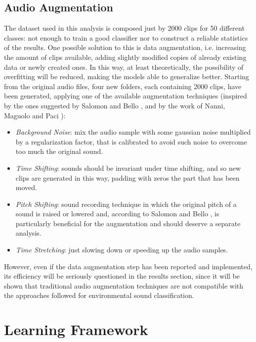 \subsection{Audio Augmentation}
\label{sec:audio_augmentation}
The dataset used in this analysis is composed just by 2000 clips for 50 different classes: not enough to train a good classifier nor to construct a reliable statistics of the results.
One possible solution to this is data augmentation, i.e. increasing the amount of clips available, adding slightly modified copies of already existing data or newly created ones. In this way, at least theoretically, the possibility of overfitting will be reduced, making the models able to generalize better. Starting from the original audio files, four new folders, each containing 2000 clips, have been generated, applying one of the available augmentation techniques (inspired by the ones suggested by Salomon and Bello \cite{salamon_bello}, and by the work of Nanni, Maguolo and Paci \cite{animal_augmentation}):
\begin{itemize}
	\itemsep0em
	\item \textit{Background Noise}: mix the audio sample with some gaussian noise multiplied by a regularization factor, that is calibrated to avoid such noise to overcome too much the original sound.
	\item \textit{Time Shifting}: sounds should be invariant under time shifting, and so new clips are generated in this way, padding with zeros the part that has been moved.
	\item \textit{Pitch Shifting}: sound recording technique in which the original pitch of a sound is raised or lowered and, according to Salomon and Bello \cite{salamon_bello}, is particularly beneficial for the augmentation and should deserve a separate analysis.
	\item \textit{Time Stretching}: just slowing down or speeding up the audio samples.
\end{itemize}

However, even if the data augmentation step has been reported and implemented, its efficiency will be seriously questioned in the results section, since it will be shown that traditional audio augmentation techniques are not compatible with the approaches followed for environmental sound classification.


\section{Learning Framework}
\label{sec:learning_framework}

